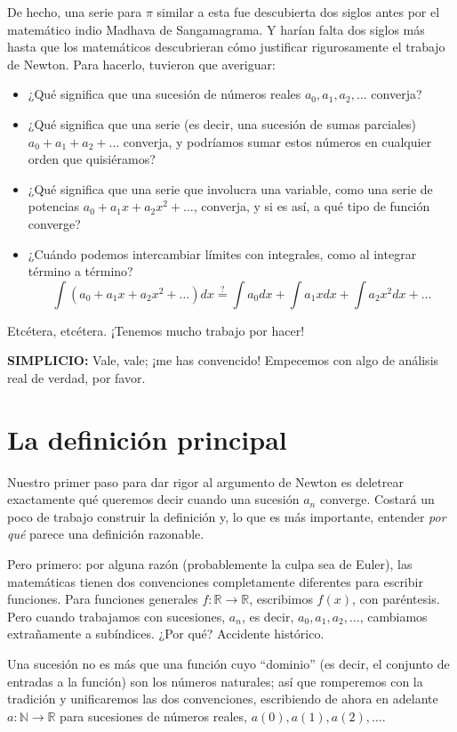 \noindent De hecho, una serie para $\pi$ similar a esta fue descubierta
dos siglos antes por el matemático indio Madhava de Sangamagrama. Y
harían falta dos siglos más hasta que los matemáticos descubrieran cómo
justificar rigurosamente el trabajo de Newton. Para hacerlo, tuvieron
que averiguar:
\begin{itemize}
\item ¿Qué significa que una sucesión de números reales
  $a_0, a_1, a_2, \dots$ converja?
\item ¿Qué significa que una serie (es decir, una sucesión de sumas
  parciales) $a_0 + a_1 + a_2 + \dots$ converja, y podríamos sumar estos
  números en cualquier orden que quisiéramos?
\item ¿Qué significa que una serie que involucra una variable, como una
  serie de potencias $a_0 + a_1x + a_2x^2 + \dots$, converja, y si es
  así, a qué tipo de función converge?
    \item ¿Cuándo podemos intercambiar límites con integrales, como al integrar término a término?
    \[ \int (a_0 + a_1x + a_2x^2 + \dots) dx \stackrel{?}{=} \int a_0 dx + \int a_1x dx + \int a_2x^2 dx + \dots \]
\end{itemize}
Etcétera, etcétera. ¡Tenemos mucho trabajo por hacer!

\noindent \textbf{SIMPLICIO:} Vale, vale; ¡me has convencido! Empecemos
con algo de análisis real de verdad, por favor.

\section{La definición principal}

Nuestro primer paso para dar rigor al argumento de Newton es deletrear
exactamente qué queremos decir cuando una sucesión $a_n$
converge. Costará un poco de trabajo construir la definición y, lo que
es más importante, entender \textit{por qué} parece una definición
razonable.

Pero primero: por alguna razón (probablemente la culpa sea de Euler),
las matemáticas tienen dos convenciones completamente diferentes para
escribir funciones. Para funciones generales
$f : \mathbb{R} \to \mathbb{R}$, escribimos $f(x)$, con paréntesis. Pero cuando trabajamos
con sucesiones, $a_n$, es decir, $a_0, a_1, a_2, \dots$, cambiamos
extrañamente a subíndices. ¿Por qué? Accidente histórico.

Una sucesión no es más que una función cuyo ``dominio'' (es decir, el
conjunto de entradas a la función) son los números naturales; así que
romperemos con la tradición y unificaremos las dos convenciones,
escribiendo de ahora en adelante $a : \mathbb{N} \to \mathbb{R}$ para sucesiones de números
reales, $a(0), a(1), a(2), \dots$.

